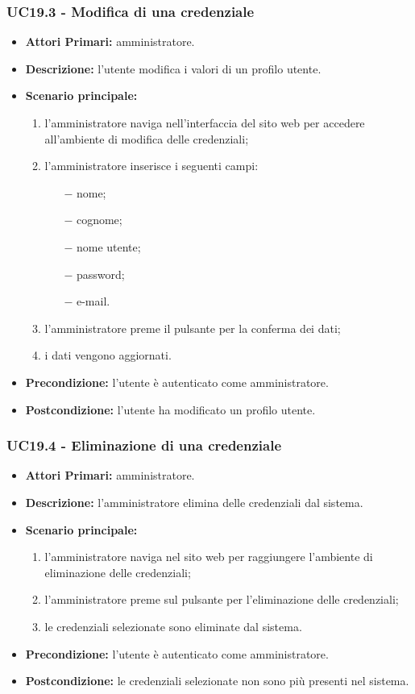 \subsubsection{ UC19.3 - Modifica di una credenziale}
\begin{itemize}
	\item\textbf{Attori Primari:} 
	amministratore.
	\item\textbf{Descrizione:} 
	l'utente modifica i valori di un profilo utente.
	\item\textbf{Scenario principale:} 
	\begin{enumerate}
		\item l'amministratore naviga nell'interfaccia del sito web per accedere all'ambiente di modifica delle credenziali;
		\item l'amministratore inserisce i seguenti campi:
		\begin{itemize}
			\item[$-$] nome;
			\item[$-$] cognome;
			\item[$-$] nome utente;
			\item[$-$] password;
			\item[$-$] e-mail.
		\end{itemize}		
		\item l'amministratore preme il pulsante per la conferma dei dati;
		\item i dati vengono aggiornati.
	\end{enumerate}
	\item\textbf{Precondizione:} 
	l'utente è autenticato come amministratore.
	\item\textbf{Postcondizione:}
	l'utente ha modificato un profilo utente.
\end{itemize}

\subsubsection{ UC19.4 - Eliminazione di una credenziale}
\begin{itemize}
	\item\textbf{Attori Primari:} 
	amministratore.
	\item\textbf{Descrizione:} 
	l'amministratore elimina delle credenziali dal sistema.
	\item\textbf{Scenario principale:} 
	\begin{enumerate}
		\item l'amministratore naviga nel sito web per raggiungere l'ambiente di eliminazione delle credenziali;
		\item l'amministratore preme sul pulsante per l'eliminazione delle credenziali;
		\item le credenziali selezionate sono eliminate dal sistema.
	\end{enumerate}
	\item\textbf{Precondizione:} 
	l'utente è autenticato come amministratore.
	\item\textbf{Postcondizione:}
	le credenziali selezionate non sono più presenti nel sistema.
\end{itemize}

